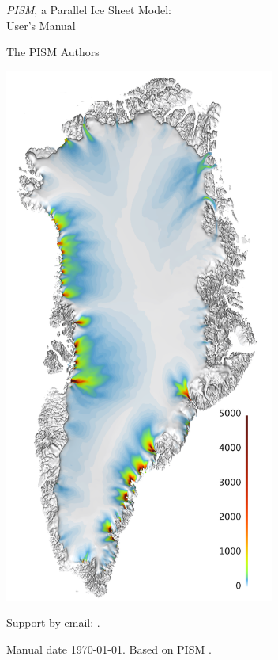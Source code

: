 \documentclass[titlepage,letterpaper,final]{scrartcl}
\begin{document}
\graphicspath{{figs/}}

\begin{titlepage}

  \begin{center}
    {\huge{} \emph{PISM}, a Parallel Ice Sheet Model:\\\medskip User's Manual}
    \vspace{0.5cm}

    {\Large The PISM Authors}
    \vspace{1cm}

    \includegraphics[width=3.5in]{grn-1km-csurf}
    \vfill

    \small Support by email: \PISMEMAIL. 
    \medskip

    Manual date \today. Based on PISM \PISMREV.
    \medskip
    
    \PISMDOWNLOADMSG
  \end{center}
\end{titlepage}
\end{document}
